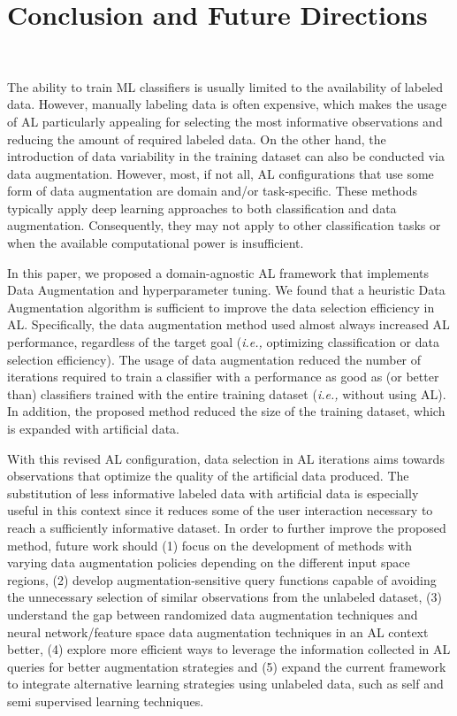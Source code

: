 \section{Conclusion and Future Directions}~\label{sec:conclusion-al-aug}

The ability to train ML classifiers is usually limited to the availability of
labeled data. However, manually labeling data is often expensive, which makes
the usage of AL particularly appealing for selecting the most informative
observations and reducing the amount of required labeled data. On the other
hand, the introduction of data variability in the training dataset can also be
conducted via data augmentation. However, most, if not all, AL configurations
that use some form of data augmentation are domain and/or task-specific. These
methods typically apply deep learning approaches to both classification and
data augmentation. Consequently, they may not apply to other classification
tasks or when the available computational power is insufficient.

In this paper, we proposed a domain-agnostic AL framework that implements Data
Augmentation and hyperparameter tuning. We found that a heuristic Data
Augmentation algorithm is sufficient to improve the data selection efficiency
in AL\@. Specifically, the data augmentation method used almost always
increased AL performance, regardless of the target goal (\textit{i.e.,}
optimizing classification or data selection efficiency). The usage of data
augmentation reduced the number of iterations required to train a classifier
with a performance as good as (or better than) classifiers trained with the
entire training dataset (\textit{i.e.,} without using AL). In addition, the
proposed method reduced the size of the training dataset, which is expanded
with artificial data. 

With this revised AL configuration, data selection in AL iterations aims
towards observations that optimize the quality of the artificial data
produced. The substitution of less informative labeled data with artificial
data is especially useful in this context since it reduces some of the user
interaction necessary to reach a sufficiently informative dataset. In order
to further improve the proposed method, future work should (1) focus on the
development of methods with varying data augmentation policies depending on
the different input space regions, (2) develop augmentation-sensitive query
functions capable of avoiding the unnecessary selection of similar
observations from the unlabeled dataset, (3) understand the gap between
randomized data augmentation techniques and neural network/feature
space data augmentation techniques in an AL context better, (4) explore
more efficient ways to leverage the information collected in AL queries for
better augmentation strategies and (5) expand the current framework to
integrate alternative learning strategies using unlabeled data, such as self
and semi supervised learning techniques.

